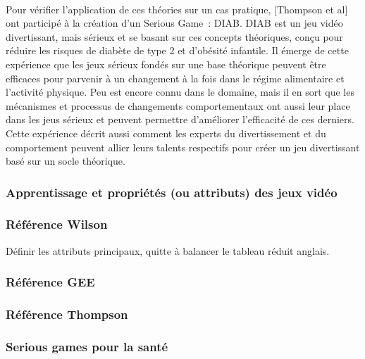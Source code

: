 \paragraph{}
Pour vérifier l'application de ces théories sur un cas pratique, [Thompson et al] ont participé à la création d'un Serious Game~: DIAB. DIAB est un jeu vidéo divertissant, mais sérieux et se basant sur ces concepts théoriques, conçu pour réduire les risques de diabète de type 2 et d’obésité infantile. Il émerge de cette expérience que les jeux sérieux fondés sur une base théorique peuvent être efficaces pour parvenir à un changement à la fois dans le régime alimentaire et l’activité physique. Peu est encore connu dans le domaine, mais il en sort que les mécanismes et processus de changements comportementaux ont aussi leur place dans les jeus sérieux  et peuvent permettre d'améliorer l'efficacité de ces derniers. Cette expérience décrit aussi comment les experts du divertissement et du comportement peuvent allier leurs talents respectifs pour créer un jeu divertissant basé sur un socle théorique. 
	\subsubsection{Apprentissage et propriétés (ou attributs) des jeux vidéo}
			\subsubsection*{Référence Wilson}
			Définir les attributs principaux, quitte à balancer le tableau réduit anglais.
			
			\subsubsection*{Référence GEE}

			\subsubsection*{Référence Thompson}						
			
	\subsubsection{Serious games pour la santé}

